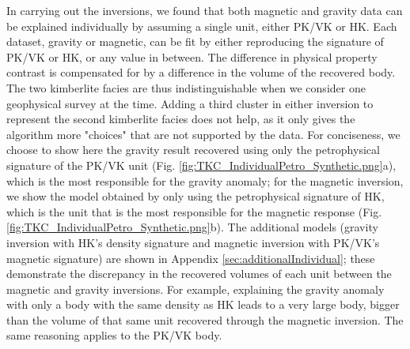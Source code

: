 \documentclass[extra, mreferee]{gji_joint} %
\begin{document}
In carrying out the inversions, we found that both magnetic and gravity data can be explained individually by assuming a single unit, either PK/VK or HK. Each dataset, gravity or magnetic, can be fit by either reproducing the signature of PK/VK or HK, or any value in between. The difference in physical property contrast is compensated for by a difference in the volume of the recovered body. The two kimberlite facies are thus indistinguishable when we consider one geophysical survey at the time. Adding a third cluster in either inversion to represent the second kimberlite facies does not help, as it only gives the algorithm more "choices" that are not supported by the data. For conciseness, we choose to show here the gravity result recovered using only the petrophysical signature of the PK/VK unit (Fig. \ref{fig:TKC_IndividualPetro_Synthetic.png}a), which is the most responsible for the gravity anomaly; for the magnetic inversion, we show the model obtained by only using the petrophysical signature of HK, which is the unit that is the most responsible for the magnetic response (Fig. \ref{fig:TKC_IndividualPetro_Synthetic.png}b). The additional models (gravity inversion with HK's density signature and magnetic inversion with PK/VK's magnetic signature) are shown in Appendix \ref{sec:additionalIndividual}; these demonstrate the discrepancy in the recovered volumes of each unit between the magnetic and gravity inversions. For example, explaining the gravity anomaly with only a body with the same density as HK leads to a very large body, bigger than the volume of that same unit recovered through the magnetic inversion. The same reasoning applies to the PK/VK body.
\end{document}
